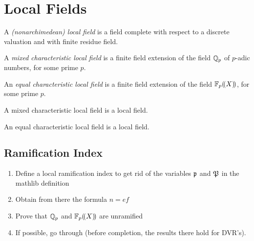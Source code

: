 \section{Local Fields}
\begin{def}
	\label{def:LocalField}
	\leanok
	A \textit{(nonarchimedean) local field} is a field complete with respect to a discrete
	valuation and with finite residue field.
\end{def}

\begin{def}
	\label{def:MixedCharLocalField}
	\leanok
	A \textit{mixed characteristic local field} is a finite field extension of the field 
	$\Qp$ of $p$-adic numbers, for some prime $p$.
\end{def}

\begin{def}
	\label{def:EqCharLocalField}
	\leanok
	An \textit{equal characteristic local field} is a finite field extension of the field 
	$\laurentseries$, for some prime $p$.
\end{def}

\begin{lemma}
	\label{lem:MixedCharLocalField.localField}
	A mixed characteristic local field is a local field.
\end{lemma}

\begin{lemma}
	\label{lem:EqCharLocalField.localField}
	An equal characteristic local field is a local field.
\end{lemma}
\subsection{Ramification Index}
\begin{enumerate}
	\item Define a local ramification index to get rid of the variables $\primeid$ and $\primeid[P]$ in the mathlib definition
	\item Obtain from there the formula $n=ef$
	\item Prove that $\Qp$ and $\laurentseries$ are unramified
	\item If possible, go through \cite[Chap. I, \S6]{Se2} (before completion, the results there hold for DVR's).
\end{enumerate}
